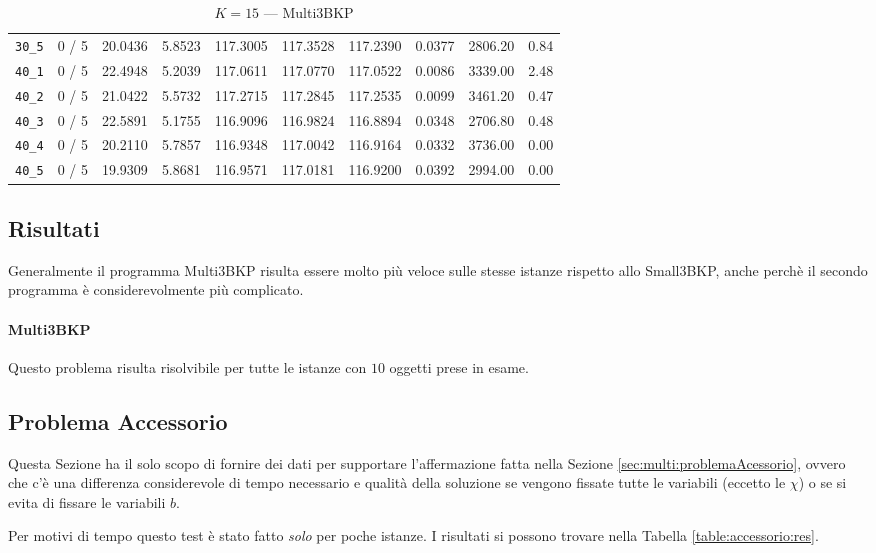 \begin{table}[h!]
\begin{center}
\begin{tabular}{| c | c | c | c | c | c | c | c | c | c |}
\verb|30_5| & 0 / 5 & 20.0436 & 5.8523 & 117.3005 & 117.3528 & 117.2390 & 0.0377 & 2806.20 & 0.84\\ 
\verb|40_1| & 0 / 5 & 22.4948 & 5.2039 & 117.0611 & 117.0770 & 117.0522 & 0.0086 & 3339.00 & 2.48\\ 
\verb|40_2| & 0 / 5 & 21.0422 & 5.5732 & 117.2715 & 117.2845 & 117.2535 & 0.0099 & 3461.20 & 0.47\\ 
\verb|40_3| & 0 / 5 & 22.5891 & 5.1755 & 116.9096 & 116.9824 & 116.8894 & 0.0348 & 2706.80 & 0.48\\ 
\verb|40_4| & 0 / 5 & 20.2110 & 5.7857 & 116.9348 & 117.0042 & 116.9164 & 0.0332 & 3736.00 & 0.00\\ 
\verb|40_5| & 0 / 5 & 19.9309 & 5.8681 & 116.9571 & 117.0181 & 116.9200 & 0.0392 & 2994.00 & 0.00\\ 
\hline
\end{tabular}
\caption{$K = 15$ --- Multi3BKP}
\label{table:multi:15}
\end{center}
\end{table}


\subsection{Risultati}
Generalmente il programma Multi3BKP risulta essere molto più veloce sulle 
stesse istanze rispetto allo Small3BKP, anche perchè il secondo programma 
è considerevolmente più complicato. 

\paragraph{Multi3BKP}
Questo problema risulta risolvibile per tutte le istanze con $10$ oggetti prese
in esame. 







\subsection{Problema Accessorio}
Questa Sezione ha il solo scopo di fornire dei dati per supportare l'affermazione
fatta nella Sezione \ref{sec:multi:problemaAcessorio}, ovvero che c'è una 
differenza  considerevole di tempo necessario e qualità della soluzione se 
vengono fissate 
tutte le variabili (eccetto le $\chi$) o se si evita di fissare le variabili
$b$.

Per motivi di tempo questo test è stato fatto \emph{solo} per poche istanze.
I risultati si possono trovare nella Tabella \ref{table:accessorio:res}.

